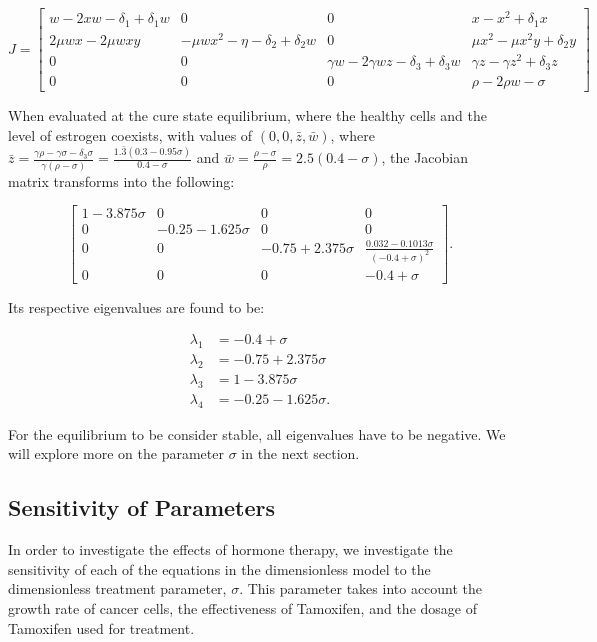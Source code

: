 \documentclass[12pt]{article}
\begin{document}
\[
J=
\begin{bmatrix}
    w - 2xw - \delta_1 + \delta_1 w & 0 & 0 & x-x^2+\delta_1 x \\
    2\mu w x - 2\mu w x y & -\mu w x^2 - \eta - \delta_2 + \delta_2 w & 0 & \mu x^2 - \mu x^2 y + \delta_2 y \\
    0 & 0 & \gamma w - 2\gamma w z - \delta_3 + \delta_3 w & \gamma z - \gamma z^2 + \delta_3 z \\
    0 & 0 & 0 & \rho - 2 \rho w - \sigma
\end{bmatrix}
\]

When evaluated at the cure state equilibrium, where the healthy cells and the level of estrogen coexists, with values of $(0,0,\bar{z}, \bar{w})$, where $\bar{z}=\frac{\gamma \rho - \gamma \sigma - \delta_3 \sigma}{\gamma (\rho - \sigma)}= \frac{1.\bar{3}(0.3-0.95\sigma)}{0.4-\sigma}$ and $\bar{w} = \frac{\rho - \sigma}{\rho} = 2.5(0.4-\sigma)$, the Jacobian matrix transforms into the following:

\[
\begin{bmatrix}
    1-3.875\sigma & 0 & 0 & 0 \\
    0 & -0.25-1.625\sigma & 0 & 0 \\
    0 & 0 & -0.75+2.375\sigma & \frac{0.032-0.1013\sigma}{(-0.4+\sigma)^2} \\
    0 & 0 & 0 & -0.4+\sigma
\end{bmatrix}.
\]

Its respective eigenvalues are found to be:

\begin{align*}
    \lambda_1 &= -0.4 + \sigma \\
    \lambda_2 &= -0.75 + 2.375\sigma \\
    \lambda_3 &= 1-3.875\sigma \\
    \lambda_4 &= -0.25 - 1.625\sigma . 
\end{align*}

For the equilibrium to be consider stable, all eigenvalues have to be negative. We will explore more on the parameter $\sigma$ in the next section. 

\subsection{Sensitivity of Parameters}
\indent\indent 
In order to investigate the effects of hormone therapy, we investigate the sensitivity of each of the equations in the dimensionless model to the dimensionless treatment parameter, \(\sigma\). This parameter takes into account the growth rate of cancer cells, the effectiveness of Tamoxifen, and the dosage of Tamoxifen used for treatment. 
\end{document}

